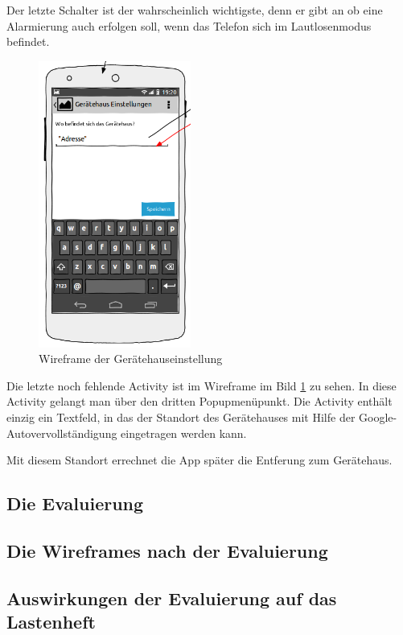 Der letzte Schalter ist der wahrscheinlich wichtigste, denn er gibt an ob eine Alarmierung auch erfolgen soll, wenn das Telefon sich im Lautlosenmodus befindet.

\begin{figure}
\vspace{-13pt}
\includegraphics[width=5cm]{Bilder/WireframeGeraetehaus.png}
\caption{Wireframe der Ger\"atehauseinstellung}
\label{Wireframe Geraetehaus}
\vspace{-250pt}
\end{figure}
Die letzte noch fehlende Activity ist im Wireframe im Bild \ref{Wireframe Geraetehaus} zu sehen. In diese Activity gelangt man \"uber den dritten Popupmen\"upunkt. Die Activity enth\"alt einzig ein Textfeld, in das der Standort des Ger\"atehauses mit Hilfe der Google-Autovervollst\"andigung eingetragen werden kann.

Mit diesem Standort errechnet die App sp\"ater die Entferung zum Ger\"atehaus.
\newpage


\subsection{Die Evaluierung}

\subsection{Die Wireframes nach der Evaluierung}

\subsection{Auswirkungen der Evaluierung auf das Lastenheft}